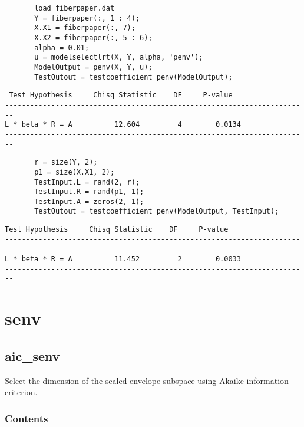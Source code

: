 \documentclass[a4paper,11pt,openany]{memoir}
\begin{document}
\begin{verbatim}       load fiberpaper.dat
       Y = fiberpaper(:, 1 : 4);
       X.X1 = fiberpaper(:, 7);
       X.X2 = fiberpaper(:, 5 : 6);
       alpha = 0.01;
       u = modelselectlrt(X, Y, alpha, 'penv');
       ModelOutput = penv(X, Y, u);
       TestOutout = testcoefficient_penv(ModelOutput);\end{verbatim}
        \color{lightgray}\ttfamily \begin{verbatim}
 Test Hypothesis     Chisq Statistic    DF     P-value
------------------------------------------------------------------------
L * beta * R = A          12.604         4        0.0134
------------------------------------------------------------------------
\end{verbatim} \rmfamily
\color{black}
\begin{verbatim}
       r = size(Y, 2);
       p1 = size(X.X1, 2);
       TestInput.L = rand(2, r);
       TestInput.R = rand(p1, 1);
       TestInput.A = zeros(2, 1);
       TestOutout = testcoefficient_penv(ModelOutput, TestInput);\end{verbatim}
   

         \color{lightgray}\ttfamily \begin{verbatim}
Test Hypothesis     Chisq Statistic    DF     P-value
------------------------------------------------------------------------
L * beta * R = A          11.452         2        0.0033
------------------------------------------------------------------------
\end{verbatim} \rmfamily
\color{black}

\newpage
\chapter{senv}
    
    
\rmfamily
\color{black}\section{aic\_senv}

\begin{par}
Select the dimension of the scaled envelope subspace using Akaike information criterion.
\end{par} \vspace{1em}

\subsection*{Contents}
\end{document}
